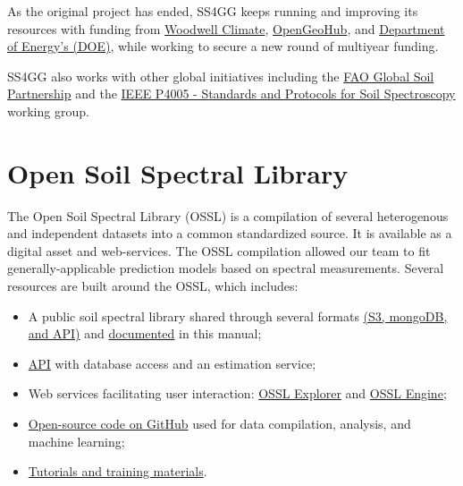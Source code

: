 \documentclass[
  letterpaper,
  DIV=11,
  numbers=noendperiod]{scrreprt}
\providecommand{\tightlist}{%
  \setlength{\itemsep}{0pt}\setlength{\parskip}{0pt}}\usepackage{longtable,booktabs,array}
\begin{document}
As the original project has ended, SS4GG keeps running and improving its
resources with funding from
\href{https://www.woodwellclimate.org/air-quality-monitoring-to-machine-learning-fund-for-climate-solutions-awards-six-new-grants/}{Woodwell
Climate}, \href{https://opengeohub.org/}{OpenGeoHub}, and
\href{https://www.llnl.gov/article/50411/lawrence-livermore-grabs-two-spots-does-energy-earthshot-program}{Department
of Energy's (DOE)}, while working to secure a new round of multiyear
funding.

SS4GG also works with other global initiatives including the
\href{https://www.fao.org/global-soil-partnership/glosolan-old/soil-analysis/dry-chemistry-spectroscopy/en/}{FAO
Global Soil Partnership} and the
\href{https://sagroups.ieee.org/4005/}{IEEE P4005 - Standards and
Protocols for Soil Spectroscopy} working group.

\section*{Open Soil Spectral Library}\label{open-soil-spectral-library}


The Open Soil Spectral Library (OSSL) is a compilation of several
heterogenous and independent datasets into a common standardized source.
It is available as a digital asset and web-services. The OSSL
compilation allowed our team to fit generally-applicable prediction
models based on spectral measurements. Several resources are built
around the OSSL, which includes:

\begin{itemize}
\tightlist
\item
  A public soil spectral library shared through several formats
  \href{https://soilspectroscopy.github.io/ossl-manual/database-access.html}{(S3,
  mongoDB, and API)} and
  \href{https://soilspectroscopy.github.io/ossl-manual/database-description.html}{documented}
  in this manual;
\item
  \href{https://api.soilspectroscopy.org/__docs__/\#/}{API} with
  database access and an estimation service;
\item
  Web services facilitating user interaction:
  \href{https://explorer.soilspectroscopy.org/}{OSSL Explorer} and
  \href{https://engine.soilspectroscopy.org/}{OSSL Engine};
\item
  \href{https://github.com/soilspectroscopy}{Open-source code on GitHub}
  used for data compilation, analysis, and machine learning;
\item
  \href{https://soilspectroscopy.github.io/ossl-manual/hands-on-tutorial.html}{Tutorials
  and training materials}.
\end{itemize}
\end{document}
